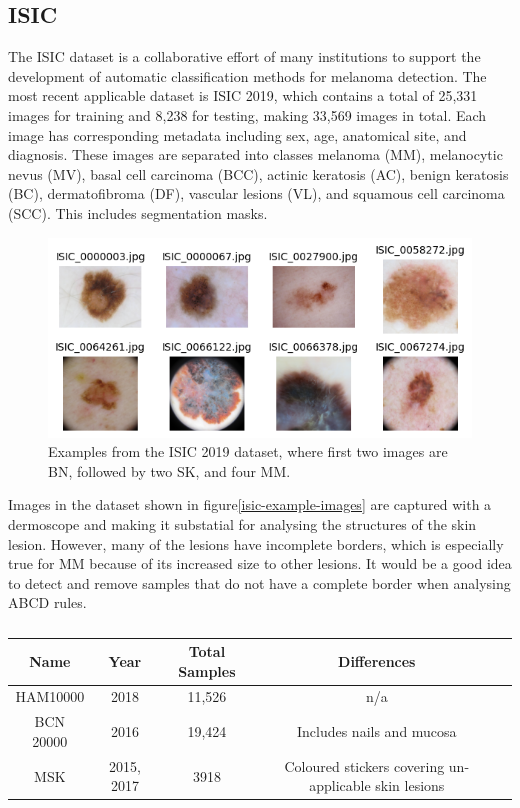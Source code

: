 \subsection{ISIC}
The ISIC dataset is a collaborative effort of many institutions to support the development of automatic classification methods for melanoma detection. The most recent applicable dataset is ISIC 2019, which contains a total of 25,331 images for training and 8,238 for testing, making 33,569 images in total. Each image has corresponding metadata including sex, age, anatomical site, and diagnosis. These images are separated into classes melanoma (MM), melanocytic nevus (MV), basal cell carcinoma (BCC), actinic keratosis (AC), benign keratosis (BC), dermatofibroma (DF), vascular lesions (VL), and squamous cell carcinoma (SCC). This includes segmentation masks.

\begin{figure}
    \centering
    \includegraphics[scale=0.75]{images/ISIC/isic-example-images.png}
    \caption{Examples from the ISIC 2019 dataset, where first two images are BN, followed by two SK, and four MM.} 
\end{figure}\label{isic-example-images}

Images in the dataset shown in figure\ref{isic-example-images} are captured with a dermoscope and making it substatial for analysing the structures of the skin lesion. However, many of the lesions have incomplete borders, which is especially true for MM because of its increased size to other lesions. It would be a good idea to detect and remove samples that do not have a complete border when analysing ABCD rules.

\begin{table}
    \small
    \begin{tabular}{|c|c|c|c|c|}
        \hline
        Name & Year & Total Samples & Differences \\
        \hline
        HAM10000 & 2018 & 11,526 & n/a
        \\
        \hline
        BCN 20000 & 2016 & 19,424 & Includes nails and mucosa
        \\
        \hline
        MSK & 2015, 2017 & 3918 & Coloured stickers covering un-applicable skin lesions
        \\
        \hline  
    \end{tabular}
    \caption{}
\end{table}\label{ISIC_AF}

